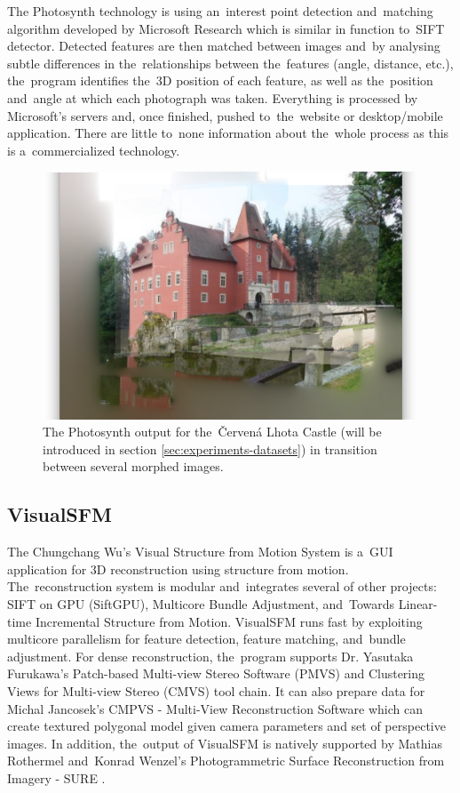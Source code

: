 The Photosynth technology is using an~interest point detection and~matching algorithm developed by Microsoft Research which is similar in function to~SIFT detector. Detected features are then matched between images and~by analysing subtle differences in the~relationships between the~features (angle, distance, etc.), the~program identifies the~3D position of each feature, as well as the~position and~angle at which each photograph was taken. Everything is processed by Microsoft's servers and, once finished, pushed to~the~website or desktop/mobile application. There are little to~none information about the~whole process as this is a~commercialized technology. \cite{www:photosynth}

\begin{figure}[ht]
	\begin{center}
		\includegraphics[keepaspectratio,width=\textwidth]{fig/Photosynth.png}
	\end{center}
	\caption{The Photosynth output for the~Červená Lhota Castle (will be introduced in section \ref{sec:experiments-datasets}) in transition between several morphed images.}
	\label{fig:photosynth}
\end{figure}

\subsection*{VisualSFM}
The Chungchang Wu's Visual Structure from Motion System \cite{www:visual_sfm} is a~GUI application for 3D reconstruction using structure from motion. The~reconstruction system is modular and~integrates several of other projects: SIFT on GPU (SiftGPU), Multicore Bundle Adjustment, and~Towards Linear-time Incremental Structure from Motion. VisualSFM runs fast by exploiting multicore parallelism for feature detection, feature matching, and~bundle adjustment. For dense reconstruction, the~program supports Dr. Yasutaka Furukawa's Patch-based Multi-view Stereo Software (PMVS)\cite{pmvs} and Clustering Views for Multi-view Stereo (CMVS)\cite{cmvs} tool chain. It can also prepare data for Michal Jancosek's CMPVS \cite{book:cmpmvs, www:cmpmvs} - Multi-View Reconstruction Software which can create textured polygonal model given camera parameters and set of perspective images. In addition, the~output of VisualSFM is natively supported by Mathias Rothermel and~Konrad Wenzel's Photogrammetric Surface Reconstruction from Imagery - SURE \cite{www:sure}.

